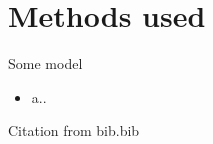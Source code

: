 \section{Methods used}

\begin{frame}[c]{Some model}
    \begin{minipage}{0.45\textwidth}
        \begin{itemize}
            \item a..
        \end{itemize}
    \end{minipage}
    \begin{minipage}{0.5\textwidth}
        \centering
    \end{minipage}
    Citation from bib.bib \cite{lecun2015deep}
\end{frame}
